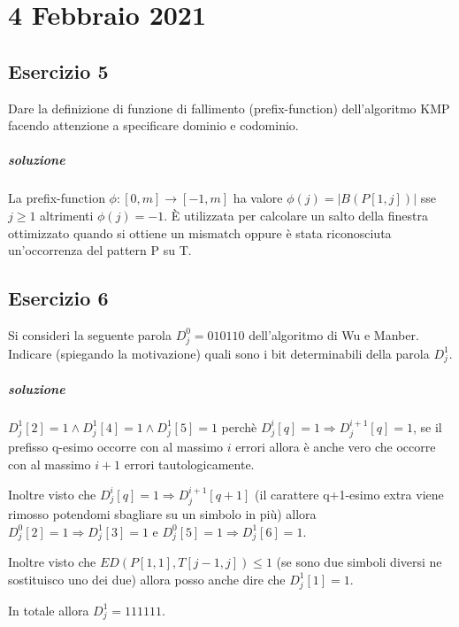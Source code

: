 \chapter{4 Febbraio 2021}

\section{Esercizio 5}

Dare la definizione di funzione di fallimento (prefix-function) dell'algoritmo KMP facendo attenzione a specificare dominio e codominio.

\paragraph{soluzione}

La prefix-function $\phi : [0, m] \rightarrow [-1, m]$ ha valore $\phi(j) = |B(P[1,j])|$ sse $j \geq 1$ altrimenti $\phi(j) = -1$. \`E utilizzata per calcolare un salto della finestra ottimizzato quando si ottiene un mismatch oppure \`e stata riconosciuta un'occorrenza del pattern P su T.

\section{Esercizio 6}

Si consideri la seguente parola $D^0_j = 010110$ dell'algoritmo di Wu e Manber. Indicare (spiegando la motivazione) quali sono i bit determinabili della parola $D^1_j$.

\paragraph{soluzione}

$D^1_j[2] = 1 \land D^1_j[4] = 1 \land D^1_j[5] = 1$ perch\`e $D^i_j[q] = 1 \Rightarrow D^{i+1}_j[q] = 1$, se il prefisso q-esimo occorre con al massimo $i$ errori allora \`e anche vero che occorre con al massimo $i+1$ errori tautologicamente.

Inoltre visto che $D^i_j[q] = 1 \Rightarrow D^{i+1}_j[q+1]$ (il carattere q+1-esimo extra viene rimosso potendomi sbagliare su un simbolo in pi\`u) allora $D^0_j[2] = 1 \Rightarrow D^1_j[3] = 1$ e $D^0_j[5] = 1 \Rightarrow D^1_j[6] = 1$.

Inoltre visto che $ED(P[1,1], T[j-1,j]) \leq 1$ (se sono due simboli diversi ne sostituisco uno dei due) allora posso anche dire che $D^1_j[1] = 1$.

In totale allora $D^1_j = 111111$.

